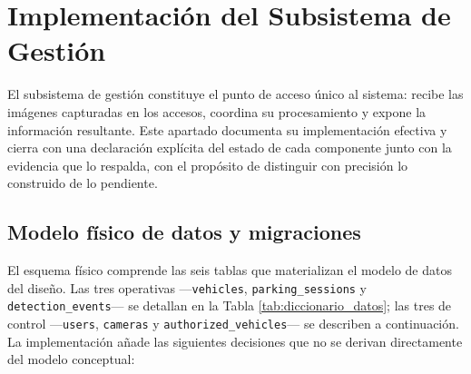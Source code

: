 \section{Implementación del Subsistema de Gestión}

El subsistema de gestión constituye el punto de acceso único al sistema: recibe
las imágenes capturadas en los accesos, coordina su procesamiento y expone la
información resultante. Este apartado documenta su implementación efectiva y
cierra con una declaración explícita del estado de cada componente junto con la
evidencia que lo respalda, con el propósito de distinguir con precisión lo
construido de lo pendiente.

\subsection{Modelo físico de datos y migraciones}

El esquema físico comprende las seis tablas que materializan el modelo de datos
del diseño. Las tres operativas ---\texttt{vehicles}, \texttt{parking\_sessions}
y \texttt{detection\_events}--- se detallan en la Tabla
\ref{tab:diccionario_datos}; las tres de control ---\texttt{users},
\texttt{cameras} y \texttt{authorized\_vehicles}--- se describen a continuación.
La implementación añade las siguientes decisiones que no se derivan directamente
del modelo conceptual:

